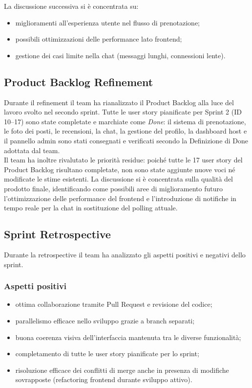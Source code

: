 \documentclass[a4paper,12pt]{article}
\begin{document}
La discussione successiva si è concentrata su:

\begin{itemize}
  \item miglioramenti all'esperienza utente nel flusso di prenotazione;
  \item possibili ottimizzazioni delle performance lato frontend;
  \item gestione dei casi limite nella chat (messaggi lunghi, connessioni lente).
\end{itemize}

\subsection{Product Backlog Refinement}

Durante il refinement il team ha rianalizzato il Product Backlog alla luce del
lavoro svolto nel secondo sprint. Tutte le user story pianificate per Sprint 2
(ID 10--17) sono state completate e marchiate come \textit{Done}: il sistema di
prenotazione, le foto dei posti, le recensioni, la chat, la gestione del profilo,
la dashboard host e il pannello admin sono stati consegnati e verificati secondo
la Definizione di Done adottata dal team.\\[0.3em]
Il team ha inoltre rivalutato le priorità residue: poiché tutte le 17 user story
del Product Backlog risultano completate, non sono state aggiunte nuove voci né
modificate le stime esistenti. La discussione si è concentrata sulla qualità del
prodotto finale, identificando come possibili aree di miglioramento futuro
l'ottimizzazione delle performance del frontend e l'introduzione di notifiche
in tempo reale per la chat in sostituzione del polling attuale.

\subsection{Sprint Retrospective}

Durante la retrospective il team ha analizzato gli aspetti positivi e negativi
dello sprint.

\subsubsection{Aspetti positivi}

\begin{itemize}
  \item ottima collaborazione tramite Pull Request e revisione del codice;
  \item parallelismo efficace nello sviluppo grazie a branch separati;
  \item buona coerenza visiva dell'interfaccia mantenuta tra le diverse funzionalità;
  \item completamento di tutte le user story pianificate per lo sprint;
  \item risoluzione efficace dei conflitti di merge anche in presenza di modifiche
        sovrapposte (refactoring frontend durante sviluppo attivo).
\end{itemize}
\end{document}
